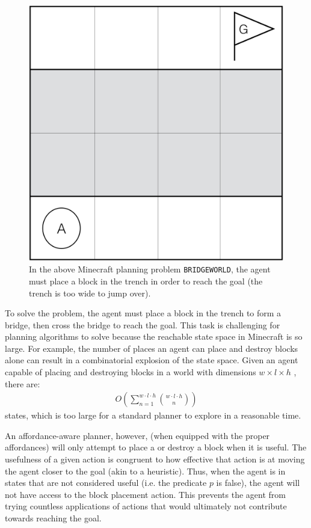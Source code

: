\documentclass[]{article}
\begin{document}
\begin{figure}
\centering
\includegraphics[scale=0.2]{figures/bridgeworld.png}
\caption{In the above Minecraft planning problem \texttt{BRIDGEWORLD},
the agent must place a block in the trench in order to reach the goal 
(the trench is too wide to jump over). \label{fig:bridgeworld}}
\end{figure}

To solve the problem, the agent must place a block in the trench to
form a bridge, then cross the bridge to reach the goal.  This task is
challenging for planning algorithms to solve because the reachable
state space in Minecraft is so large. For example, the number of
places an agent can place and destroy blocks alone can result in a
combinatorial explosion of the state space. Given an
agent capable of placing and destroying blocks in a world with dimensions
$w \times l \times h$ , there are:
\begin{align}
O\left(\sum_{n=1}^{w \cdot l \cdot h} \binom{w \cdot l \cdot h}{n}\right)
\label{eq:mc_explode}
\end{align}
states, which is too large for a standard planner to explore in a
reasonable time.

An affordance-aware planner, however, (when equipped with the proper
affordances) will only attempt to place a or destroy a block when it is useful.
The usefulness of a given action is congruent to how effective that action is
at moving the agent closer to the goal (akin to a heuristic). Thus, when the agent is in states that
are not considered useful (i.e. the predicate $p$ is false), the agent will
not have access to the block placement action. This prevents the agent
from trying countless applications of actions that would ultimately
not contribute towards reaching the goal.
\end{document}
